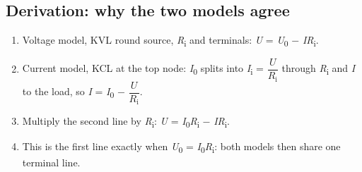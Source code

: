 \documentclass[11pt]{article}
\begin{document}
\begin{keepsection}
\begin{keepsection}
\subsection{Derivation: why the two models agree}

\begin{enumerate}
\item Voltage model, KVL round source, \textit{R}\textsubscript{i} and terminals: \textit{U} = \textit{U}\textsubscript{0} \ensuremath{-} \textit{I}\textit{R}\textsubscript{i}.
\item Current model, KCL at the top node: \textit{I}\textsubscript{0} splits into \textit{I}\textsubscript{i} = {\small\ensuremath{\dfrac{{U}}{{R}_{\mathrm{i}}}}} through \textit{R}\textsubscript{i} and \textit{I} to the load, so \textit{I} = \textit{I}\textsubscript{0} \ensuremath{-} {\small\ensuremath{\dfrac{{U}}{{R}_{\mathrm{i}}}}}.
\item Multiply the second line by \textit{R}\textsubscript{i}: \textit{U} = \textit{I}\textsubscript{0}\textit{R}\textsubscript{i} \ensuremath{-} \textit{I}\textit{R}\textsubscript{i}.
\item This is the first line exactly when \textit{U}\textsubscript{0} = \textit{I}\textsubscript{0}\textit{R}\textsubscript{i}: both models then share one terminal line.
\end{enumerate}


\end{keepsection}
\end{keepsection}
\end{document}
